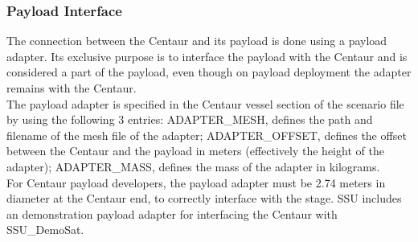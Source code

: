 \documentclass[Space_Shuttle_Ultra_Manual.tex]{subfiles}
\begin{document}
\begin{multicols*}{2}
\subsubsection{Payload Interface}
The connection between the Centaur and its payload is done using a payload adapter. Its exclusive purpose is to interface the payload with the Centaur and is considered a part of the payload, even though on payload deployment the adapter remains with the Centaur.\\
The payload adapter is specified in the Centaur vessel section of the scenario file by using the following 3 entries: ADAPTER\_MESH, defines the path and filename of the mesh file of the adapter; ADAPTER\_OFFSET, defines the offset between the Centaur and the payload in meters (effectively the height of the adapter); ADAPTER\_MASS, defines the mass of the adapter in kilograms.\\
For Centaur payload developers, the payload adapter must be 2.74 meters in diameter at the Centaur end, to correctly interface with the stage. SSU includes an demonstration payload adapter for interfacing the Centaur with SSU\_DemoSat.

\end{multicols*}
\newpage
\end{document}
